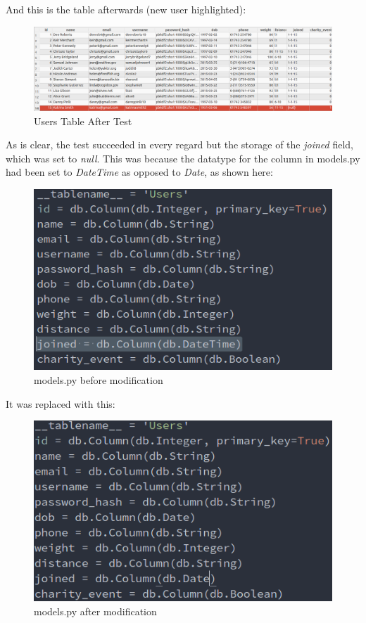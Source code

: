 \documentclass{article}[12pt,a4paper]
\begin{document}
And this is the table afterwards (new user highlighted):

\begin{figure}[h!]
  \includegraphics[scale=0.34]{images/testing/add_user/database_after_broken}
  \caption{Users Table After Test}
\end{figure}

\clearpage

As is clear, the test succeeded in every regard but the storage of the \textit{joined} field, which was set to \textit{null}. This was because the datatype for the column in models.py had been set to \textit{DateTime} as opposed to \textit{Date}, as shown here:

\begin{figure}[h!]
    \includegraphics[scale=0.5]{images/testing/add_user/code_before}
    \caption{models.py before modification}
\end{figure}

It was replaced with this:

\begin{figure}[h!]
    \includegraphics[scale=0.5]{images/testing/add_user/code_after}
    \caption{models.py after modification}
\end{figure}
\end{document}
